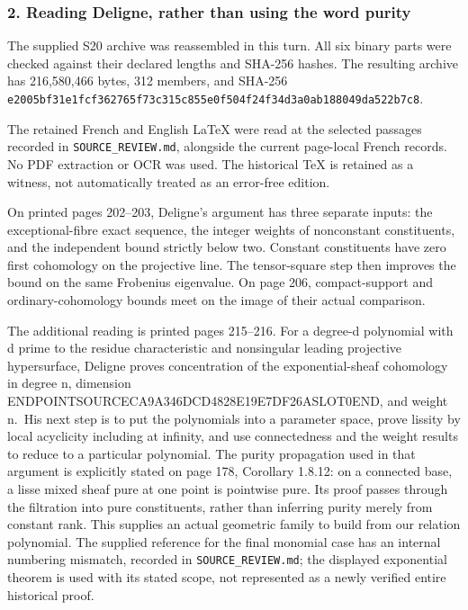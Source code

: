 \subsubsection{2. Reading Deligne, rather than using the word purity}\label{endpoint-exponential_original--reading-deligne-rather-than-using-the-word-purity}

The supplied S20 archive was reassembled in this turn. All six binary parts were checked against their declared lengths and SHA-256 hashes. The resulting archive has 216,580,466 bytes, 312 members, and SHA-256 \texttt{e2005bf31e1fcf362765f73c315c855e0f504f24f34d3a0ab188049da522b7c8}.

The retained French and English LaTeX were read at the selected passages recorded in \texttt{SOURCE\_REVIEW.md}, alongside the current page-local French records. No PDF extraction or OCR was used. The historical TeX is retained as a witness, not automatically treated as an error-free edition.

On printed pages 202--203, Deligne's argument has three separate inputs: the exceptional-fibre exact sequence, the integer weights of nonconstant constituents, and the independent bound strictly below two. Constant constituents have zero first cohomology on the projective line. The tensor-square step then improves the bound on the same Frobenius eigenvalue. On page 206, compact-support and ordinary-cohomology bounds meet on the image of their actual comparison.

The additional reading is printed pages 215--216. For a degree-d polynomial with d prime to the residue characteristic and nonsingular leading projective hypersurface, Deligne proves concentration of the exponential-sheaf cohomology in degree n, dimension ENDPOINTSOURCECA9A346DCD4828E19E7DF26ASLOT0END, and weight n.~His next step is to put the polynomials into a parameter space, prove lissity by local acyclicity including at infinity, and use connectedness and the weight results to reduce to a particular polynomial. The purity propagation used in that argument is explicitly stated on page 178, Corollary 1.8.12: on a connected base, a lisse mixed sheaf pure at one point is pointwise pure. Its proof passes through the filtration into pure constituents, rather than inferring purity merely from constant rank. This supplies an actual geometric family to build from our relation polynomial. The supplied reference for the final monomial case has an internal numbering mismatch, recorded in \texttt{SOURCE\_REVIEW.md}; the displayed exponential theorem is used with its stated scope, not represented as a newly verified entire historical proof.

